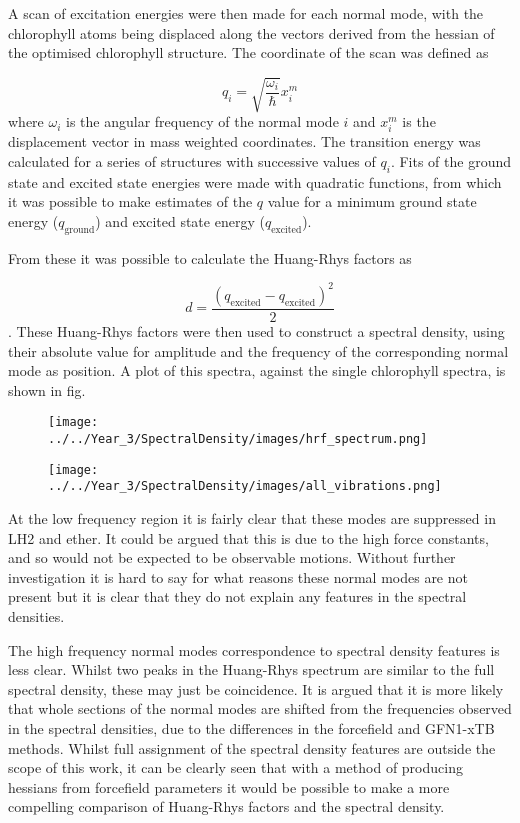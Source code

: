 A scan of excitation energies were then made for each normal mode, with the chlorophyll
atoms being displaced along the vectors derived from the hessian of the optimised
chlorophyll structure. The coordinate of the scan was defined as 

\begin{equation}
    q_i = \sqrt{\frac{\omega_i}{\hbar}} x^m_i
\end{equation}
%
where $\omega_i$ is the angular frequency of the normal mode $i$ and $x^m_i$ is
the displacement vector in mass weighted coordinates. The \Qy transition energy 
was calculated for a series of structures with successive values of $q_i$. Fits 
of the ground state and excited state energies were made with quadratic functions,
from which it was possible to make estimates of the $q$ value for a minimum ground
state energy ($q_{\text{ground}}$) and excited state energy ($q_{\text{excited}}$).

From these it was possible to calculate the Huang-Rhys factors as

\begin{equation}
    d = \frac{\left(q_{\text{excited}} - q_{\text{excited}}\right)^2}{2}
\end{equation}
%
. These Huang-Rhys factors were then used to construct a spectral density, using
their absolute value for amplitude and the frequency of the corresponding normal
mode as position. A plot of this spectra, against the single chlorophyll spectra,
is shown in fig.

\begin{figure}
    \centering
    \texttt{[image: ../../Year\_3/SpectralDensity/images/hrf\_spectrum.png]}
\end{figure}

\begin{figure}
    \centering
    \texttt{[image: ../../Year\_3/SpectralDensity/images/all\_vibrations.png]}
\end{figure}

At the low frequency region it is fairly clear that these modes are suppressed in
LH2 and ether. It could be argued that this is due to the high force constants, 
and so would not be expected to be observable motions. Without further investigation
it is hard to say for what reasons these normal modes are not present but it is 
clear that they do not explain any features in the spectral densities.

The high frequency normal modes correspondence to spectral density features is less
clear. Whilst two peaks in the Huang-Rhys spectrum are similar to the full spectral
density, these may just be coincidence. It is argued that it is more likely that 
whole sections of the normal modes are shifted from the frequencies observed in
the spectral densities, due to the differences in the forcefield and GFN1-xTB methods.
Whilst full assignment of the spectral density features are outside the scope of 
this work, it can be clearly seen that with a method of producing hessians from 
forcefield parameters it would be possible to make a more compelling comparison
of Huang-Rhys factors and the spectral density.

